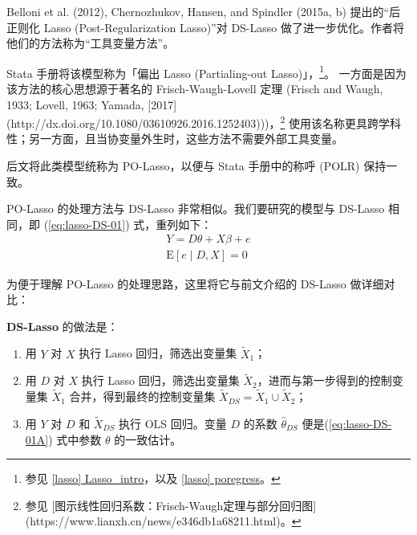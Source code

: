 


Belloni et al. (2012), Chernozhukov, Hansen, and Spindler (2015a, b) 提出的“后正则化 Lasso (Post-Regularization Lasso)”对 DS-Lasso 做了进一步优化。作者将他们的方法称为“工具变量方法”。

Stata 手册将该模型称为「偏出 Lasso (Partialing-out Lasso)」，\footnote{%
   参见 \href{https://www.stata.com/manuals/lassoLasso_intro.pdf}{[lasso] Lasso\_intro}，以及 \href{https://www.stata.com/manuals/lassoporegress.pdf}{[lasso] poregress}。}。
一方面是因为该方法的核心思想源于著名的 Frisch-Waugh-Lovell 定理 (Frisch and  Waugh, 1933; Lovell, 1963; Yamada, [2017](http://dx.doi.org/10.1080/03610926.2016.1252403)))，\footnote{%
   参见 [图示线性回归系数：Frisch-Waugh定理与部分回归图](https://www.lianxh.cn/news/e346db1a68211.html)。}
使用该名称更具跨学科性；另一方面，且当协变量外生时，这些方法不需要外部工具变量。

后文将此类模型统称为 PO-Lasso，以便与 Stata 手册中的称呼 (POLR) 保持一致。 

PO-Lasso 的处理方法与 DS-Lasso 非常相似。我们要研究的模型与 DS-Lasso 相同，即 (\ref{eq:lasso-DS-01}) 式，重列如下：
\begin{equation}\label{eq:lasso-DS-01A}
\begin{aligned}%
Y =D \theta + X \beta + e \\
\mathrm{E}[e \mid D, X] =0
\end{aligned}
\end{equation}

为便于理解 PO-Lasso 的处理思路，这里将它与前文介绍的 DS-Lasso 做详细对比：

\vspace{5pt}
\textbf{DS-Lasso} 的做法是：

\begin{enumerate}
\item 用 $Y$ 对 $X$ 执行 Lasso 回归，筛选出变量集 $\widetilde{X}_1$；
\item 用 $D$ 对 $X$ 执行 Lasso 回归，筛选出变量集 $\widetilde{X}_2$，进而与第一步得到的控制变量集 $\widetilde{X}_1$ 合并，得到最终的控制变量集 $\widetilde{X}_{DS} = \widetilde{X}_1 \cup \widetilde{X}_2$；
\item 用 $Y$ 对 $D$ 和 $\widetilde{X}_{DS}$ 执行 OLS 回归。变量 $D$ 的系数 $\widehat{\theta}_{DS}$ 便是(\ref{eq:lasso-DS-01A}) 式中参数 $\theta$ 的一致估计。
\end{enumerate}

